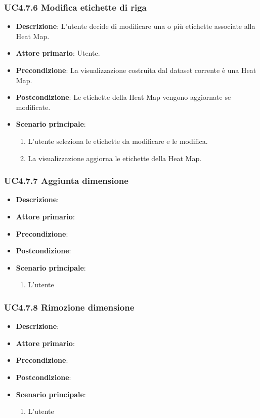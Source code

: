\subsubsection{UC4.7.6 Modifica etichette di riga}
\label{ssub:uc4.7.6}
\begin{itemize}
    \item \textbf{Descrizione}: L’utente decide di modificare una o più etichette associate alla Heat Map.

    \item \textbf{Attore primario}: Utente.
    
    \item \textbf{Precondizione}:   La visualizzazione costruita dal dataset corrente è una Heat Map.
    \item \textbf{Postcondizione}:  Le etichette della Heat Map vengono aggiornate se modificate.
	\item \textbf{Scenario principale}:
        \begin{enumerate}
            \item   L'utente seleziona le etichette da modificare e le modifica.
            \item   La visualizzazione aggiorna le etichette della Heat Map. %
        \end{enumerate}
\end{itemize}

\subsubsection{UC4.7.7 Aggiunta dimensione}
\label{ssub:4.7.7}
\begin{itemize}
    \item \textbf{Descrizione}:
    \item \textbf{Attore primario}:
    \item \textbf{Precondizione}:
    \item \textbf{Postcondizione}:
    \item \textbf{Scenario principale}:
    \begin{enumerate}
        \item L'utente
    \end{enumerate}
\end{itemize}

\subsubsection{UC4.7.8 Rimozione dimensione}
\label{ssub:4.7.8}
\begin{itemize}
    \item \textbf{Descrizione}:
    \item \textbf{Attore primario}:
    \item \textbf{Precondizione}:
    \item \textbf{Postcondizione}:
    \item \textbf{Scenario principale}:
    \begin{enumerate}
        \item L'utente
    \end{enumerate}
\end{itemize}

